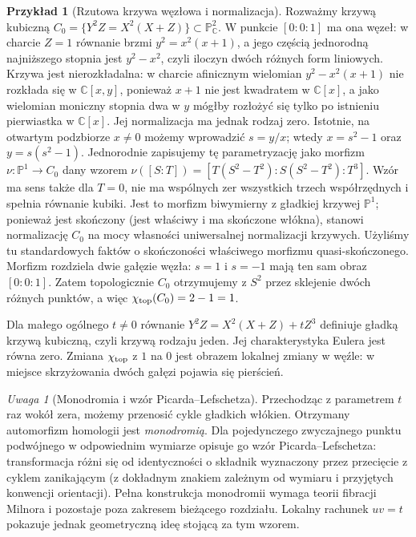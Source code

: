 \documentclass[11pt,a4paper,openany]{report}
\numberwithin{equation}{section}
\theoremstyle{plain}
\theoremstyle{definition}
\newtheorem{przyklad}[twierdzenie]{Przykład}
\theoremstyle{remark}
\newtheorem{uwaga}[twierdzenie]{Uwaga}
\newcommand{\C}{\mathbb C}
\newcommand{\PP}{\mathbb P}
\begin{document}
\begin{przyklad}[Rzutowa krzywa węzłowa i normalizacja]
Rozważmy krzywą kubiczną
$C_0=\{Y^2Z=X^2(X+Z)\}\subset\PP^2_\C$.
W punkcie $[0:0:1]$ ma ona węzeł: w charcie $Z=1$
równanie brzmi $y^2=x^2(x+1)$, a jego częścią
jednorodną najniższego stopnia jest $y^2-x^2$,
czyli iloczyn dwóch różnych form liniowych.
Krzywa jest nierozkładalna: w charcie afinicznym wielomian
$y^2-x^2(x+1)$ nie rozkłada się w $\C[x,y]$, ponieważ
$x+1$ nie jest kwadratem w $\C[x]$, a jako wielomian
moniczny stopnia dwa w $y$ mógłby rozłożyć się tylko
po istnieniu pierwiastka w $\C[x]$.
Jej normalizacja ma jednak rodzaj zero. Istotnie, na otwartym podzbiorze
$x\ne0$ możemy wprowadzić $s=y/x$; wtedy
$x=s^2-1$ oraz $y=s(s^2-1)$.
Jednorodnie zapisujemy tę parametryzację jako morfizm
$\nu\colon\PP^1\to C_0$ dany wzorem
$\nu([S:T])=[T(S^2-T^2):S(S^2-T^2):T^3]$.
Wzór ma sens także dla $T=0$, nie ma wspólnych zer wszystkich
trzech współrzędnych i spełnia równanie kubiki.
Jest to morfizm biwymierny z gładkiej krzywej $\PP^1$;
ponieważ jest skończony (jest właściwy i ma skończone włókna),
stanowi normalizację $C_0$ na mocy własności uniwersalnej
normalizacji krzywych. Użyliśmy tu standardowych faktów
o skończoności właściwego morfizmu quasi-skończonego.
Morfizm rozdziela dwie gałęzie węzła:
$s=1$ i $s=-1$ mają ten sam obraz $[0:0:1]$.
Zatem topologicznie $C_0$ otrzymujemy z $S^2$
przez sklejenie dwóch różnych punktów, a więc
$\chi_{\rm top}(C_0)=2-1=1$.

Dla małego ogólnego $t\ne0$ równanie
$Y^2Z=X^2(X+Z)+tZ^3$ definiuje gładką
krzywą kubiczną, czyli krzywą rodzaju jeden.
Jej charakterystyka Eulera jest równa zero.
Zmiana $\chi_{\rm top}$ z $1$ na $0$ jest
obrazem lokalnej zmiany w węźle: w miejsce
skrzyżowania dwóch gałęzi pojawia się pierścień.
\end{przyklad}

\begin{uwaga}[Monodromia i wzór Picarda--Lefschetza]
Przechodząc z parametrem $t$ raz wokół zera,
możemy przenosić cykle gładkich włókien.
Otrzymany automorfizm homologii jest \emph{monodromią}.
Dla pojedynczego zwyczajnego punktu podwójnego
w odpowiednim wymiarze opisuje go wzór Picarda--Lefschetza:
transformacja różni się od identyczności o składnik
wyznaczony przez przecięcie z cyklem zanikającym
(z dokładnym znakiem zależnym od wymiaru i przyjętych
konwencji orientacji). Pełna konstrukcja monodromii
wymaga teorii fibracji Milnora i pozostaje poza
zakresem bieżącego rozdziału. Lokalny rachunek $uv=t$
pokazuje jednak geometryczną ideę stojącą za tym wzorem.
\end{uwaga}
\end{document}
